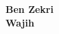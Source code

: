 \begin{itshape}
\vfill

\begin{flushright}
    \textbf{\Large Ben Zekri}\\
    \vspace{0.5em}
    \textbf{\Large Wajih}
\end{flushright}

\end{itshape}
